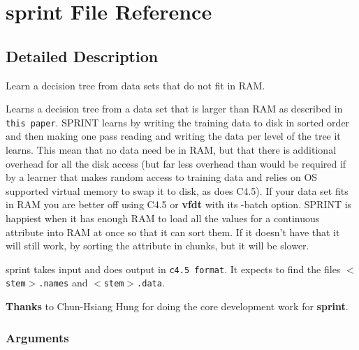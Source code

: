 \section{sprint File Reference}
\label{sprint}


\subsection{Detailed Description}
Learn a decision tree from data sets that do not fit in RAM. 

Learns a decision tree from a data set that is larger than RAM as described in {\tt this paper}. SPRINT learns by writing the training data to disk in sorted order and then making one pass reading and writing the data per level of the tree it learns. This mean that no data need be in RAM, but that there is additional overhead for all the disk access (but far less overhead than would be required if by a learner that makes random access to training data and relies on OS supported virtual memory to swap it to disk, as does C4.5). If your data set fits in RAM you are better off using C4.5 or {\bf vfdt} with its -batch option. SPRINT is happiest when it has enough RAM to load all the values for a continuous attribute into RAM at once so that it can sort them. If it doesn't have that it will still work, by sorting the attribute in chunks, but it will be slower.

sprint takes input and does output in {\tt c4.5 format}. It expects to find the files {\tt $<$stem$>$.names} and {\tt $<$stem$>$.data}.

\begin{Desc}
\item[{\bf Thanks}]to Chun-Hsiang Hung for doing the core development work for {\bf sprint}. \end{Desc}
\subsubsection*{Arguments}

